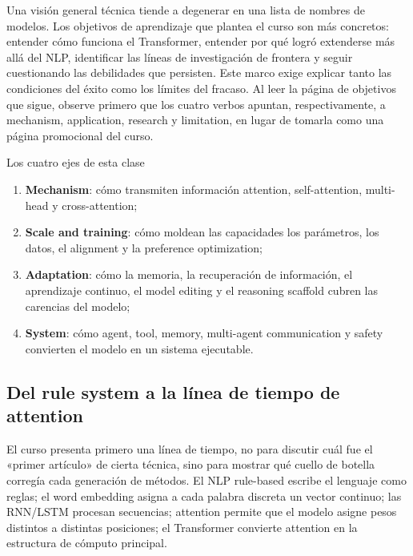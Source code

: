 Una visión general técnica tiende a degenerar en una lista de nombres de modelos. Los objetivos de aprendizaje que plantea el curso son más concretos: entender cómo funciona el Transformer, entender por qué logró extenderse más allá del NLP, identificar las líneas de investigación de frontera y seguir cuestionando las debilidades que persisten. Este marco exige explicar tanto las condiciones del éxito como los límites del fracaso. Al leer la página de objetivos que sigue, observe primero que los cuatro verbos apuntan, respectivamente, a mechanism, application, research y limitation, en lugar de tomarla como una página promocional del curso.


\begin{importantbox}{Los cuatro ejes de esta clase}
\begin{enumerate}
  \item \textbf{Mechanism}: cómo transmiten información attention, self-attention, multi-head y cross-attention;
  \item \textbf{Scale and training}: cómo moldean las capacidades los parámetros, los datos, el alignment y la preference optimization;
  \item \textbf{Adaptation}: cómo la memoria, la recuperación de información, el aprendizaje continuo, el model editing y el reasoning scaffold cubren las carencias del modelo;
  \item \textbf{System}: cómo agent, tool, memory, multi-agent communication y safety convierten el modelo en un sistema ejecutable.
\end{enumerate}
\end{importantbox}

\subsection{Del rule system a la línea de tiempo de attention}

El curso presenta primero una línea de tiempo, no para discutir cuál fue el «primer artículo» de cierta técnica, sino para mostrar qué cuello de botella corregía cada generación de métodos. El NLP rule-based escribe el lenguaje como reglas; el word embedding asigna a cada palabra discreta un vector continuo; las RNN/LSTM procesan secuencias; attention permite que el modelo asigne pesos distintos a distintas posiciones; el Transformer convierte attention en la estructura de cómputo principal.

